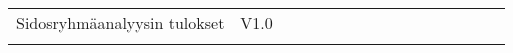 \begin{table}[]
\begin{tabular}{llllllllllllllll}
Sidosryhmäanalyysin tulokset                                                                                                                       & V1.0                                                                                                                &                                                                                                                  &                                                                                                &                                                                                    &                                  &                                   &                                        &                                                                                         &                                      &                                                       &                                      &                                                                                                    &                                     &                                   &                                 \\
                                                                                                                                                   &                                                                                                                     &                                                                                                                  &                                                                                                &                                                                                    &                                  &                                   &                                        &                                                                                         &                                      &                                                       &                                      &                                                                                                    &                                     &                                   &                                 \\

\end{tabular}
\end{table}
